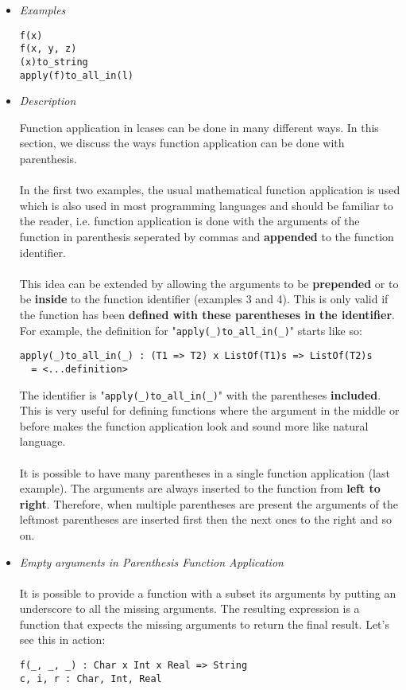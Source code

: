 \documentclass{article}
\begin{document}
\begin{itemize}
\item \textit{Examples}

\begin{verbatim}
f(x)
f(x, y, z)
(x)to_string
apply(f)to_all_in(l)
\end{verbatim}

\item \textit{Description}

Function application in lcases can be done in many different ways. In this
section, we discuss the ways function application can be done with parenthesis.
\\\\
In the first two examples, the usual mathematical function application is used
which is also used in most programming languages and should be familiar to the
reader, i.e. function application is done with the arguments of the function in
parenthesis seperated by commas and \textbf{appended} to the function
identifier.
\\\\
This idea can be extended by allowing the arguments to be \textbf{prepended} or
to be \textbf{inside} to the function identifier (examples 3 and 4). This is
only valid if the function has been \textbf{defined with these parentheses in
the identifier}. For example, the definition for
"\verb|apply(_)to_all_in(_)|"
starts like so:
\begin{verbatim}
apply(_)to_all_in(_) : (T1 => T2) x ListOf(T1)s => ListOf(T2)s
  = <...definition>
\end{verbatim}
The identifier is "\verb|apply(_)to_all_in(_)|" with the parentheses
\textbf{included}.  This is very useful for defining functions where the
argument in the middle or before makes the function application look and sound
more like natural language.
\\\\
It is possible to have many parentheses in a single function application (last
example). The arguments are always inserted to the function from \textbf{left
to right}.  Therefore, when multiple parentheses are present the arguments of
the leftmost parentheses are inserted first then the next ones to the right and
so on.

\newpage
\item \textit{Empty arguments in Parenthesis Function Application}
\\\\
It is possible to provide a function with a subset its arguments by putting an
underscore to all the missing arguments. The resulting expression is a function
that expects the missing arguments to return the final result. Let's see
this in action:
\begin{verbatim}
f(_, _, _) : Char x Int x Real => String
c, i, r : Char, Int, Real


\end{verbatim}
\end{itemize}
\end{document}
